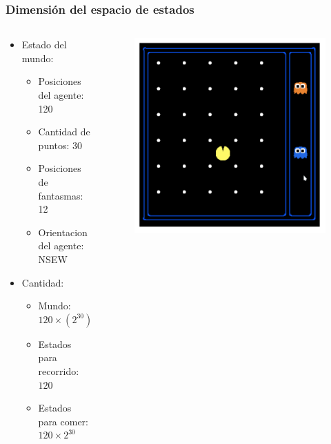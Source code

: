 \documentclass[10pt]{beamer}
\begin{document}
\begin{frame}
  \frametitle{Dimensión del espacio de estados}
  \begin{columns}
    \begin{column}{0.5\textwidth}
      \begin{itemize}
        \item Estado del mundo:
          \begin{itemize}
            \item Posiciones del agente: 120
            \item Cantidad de puntos: 30
            \item Posiciones de fantasmas: 12
            \item Orientacion del agente: NSEW
          \end{itemize}
        
        \item Cantidad:
          \begin{itemize}
            \item Mundo: $120 \times (2^30) \times (12^2) \times 4$
            \item Estados para recorrido: $120$
            \item Estados para comer: $120 \times 2^30$
          \end{itemize}
      \end{itemize}  
    \end{column}

    \begin{column}{0.5\textwidth}
      
      \begin{figure}[!h] 
        \centering
        \includegraphics[width=\textwidth]{img/estados}
      \end{figure} 

    \end{column}    
  \end{columns}

\end{frame}
\end{document}

